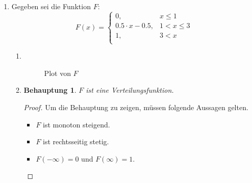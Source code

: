 \documentclass[a4paper]{scrartcl}
\newtheorem*{behaupt}{Behauptung}
\begin{document}
\begin{enumerate}[label=\bfseries\arabic*.]
    \item
        Gegeben sei die Funktion $F$:
        \begin{equation*}
            F(x) =
            \begin{cases}
                0, & x \leq 1 \\
                \num{0,5} \cdot x - \num{0,5}, & 1 < x \leq 3 \\
                1, & 3 < x \\
            \end{cases}
        \end{equation*}
        \begin{enumerate}[label=(\alph*)]
            \item \hfill \\
                \begin{figure}[H]
                    \centering
                    \caption{Plot von $F$}
                \end{figure}

            \item
                \begin{behaupt}
                    $F$ ist eine Verteilungsfunktion.
                \end{behaupt}
                \begin{proof}
                    Um die Behauptung zu zeigen, müssen folgende Aussagen
                    gelten.
                    \begin{itemize}
                        \item $F$ ist monoton steigend.
                        \item $F$ ist rechtsseitig stetig.
                        \item $F(-\infty) = 0$ und $F(\infty) = 1$.
                    \end{itemize}


\end{proof}
\end{enumerate}
\end{enumerate}
\end{document}
